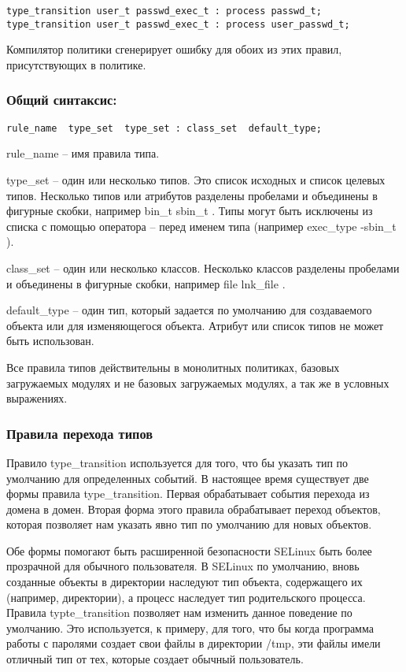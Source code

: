 \documentclass{./../class/UIR}
\begin{document}
\begin{verbatim}
type_transition user_t passwd_exec_t : process passwd_t;
type_transition user_t passwd_exec_t : process user_passwd_t;
\end{verbatim}

Компилятор политики сгенерирует ошибку для обоих из этих правил, присутствующих
в политике.
\subsubsection{Общий синтаксис:}
\begin{verbatim}
rule_name  type_set  type_set : class_set  default_type;
\end{verbatim}
\begin{description}
\item rule\_name – имя правила типа. 
\item type\_set – один или несколько типов. Это список исходных и список целевых
типов. Несколько типов или атрибутов разделены пробелами и объединены в фигурные
скобки, например { bin\_t sbin\_t }. Типы могут быть исключены из списка с
помощью оператора – перед именем типа (например { exec\_type -sbin\_t }).
\item class\_set – один или несколько классов. Несколько классов разделены
пробелами и объединены в фигурные скобки, например { file lnk\_file }.
\item default\_type – один тип, который задается по умолчанию для создаваемого
объекта или для изменяющегося объекта. Атрибут или список типов не может быть
использован.
\end{description}

Все правила типов действительны в монолитных политиках, базовых загружаемых
модулях и не базовых загружаемых модулях, а так же в условных выражениях.

\subsubsection{Правила перехода типов}

Правило type\_transition используется для того, что бы указать тип по умолчанию
для определенных событий. В настоящее время существует две формы правила
type\_transition. Первая обрабатывает события перехода из домена в домен. Вторая
форма этого правила обрабатывает переход объектов, которая позволяет нам указать
явно тип по умолчанию для новых объектов.

Обе формы помогают быть расширенной безопасности SELinux быть более прозрачной
для обычного пользователя. В SELinux по умолчанию, вновь созданные объекты в
директории наследуют тип объекта, содержащего их (например, директории), а
процесс наследует тип родительского процесса. Правила typte\_transition
позволяет нам изменить данное поведение по умолчанию. Это используется, к примеру, для
того, что бы когда программа работы с паролями создает свои файлы в директории
/tmp, эти файлы имели отличный тип от тех, которые создает обычный пользователь.
\end{document}

